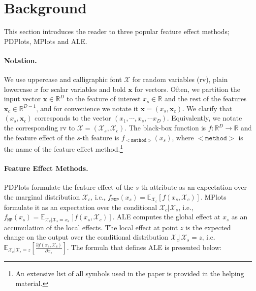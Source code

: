 \documentclass[wcp]{jmlr}
\newcommand{\xc}{\mathbf{x}_c} \newcommand{\Xcb}{\mathcal{X}_c}
\newcommand{\xb}{\mathbf{x}} \newcommand{\R}{\mathbb{R}}
\newcommand{\E}{\mathbb{E}} \newcommand{\Jac}{\mathbf{J}}
\begin{document}
\section{Background}
\label{sec:3-feature-effect}

This section introduces the reader to three popular feature effect
methods; PDPlots, MPlots and ALE.

\paragraph*{Notation.} We use uppercase and calligraphic font
\( \mathcal{X}\) for random variables (rv), plain lowercase \( x \)
for scalar variables and bold \( \xb \) for vectors. Often, we
partition the input vector \(\xb \in \R^D\) to the feature of interest
\(x_s \in \R \) and the rest of the features \(\xc \in \R^{D-1}\), and
for convenience we notate it \(\xb = (x_s, \xc)\). We clarify that
\((x_s, \xc)\) corresponds to the vector
\((x_1, \cdots, x_s, \cdots x_D)\). Equivalently, we notate the
corresponding rv to \(\mathcal{X} = (\mathcal{X}_s,
\mathcal{X}_c)\). The black-box function is
\( f: \R^D \rightarrow \R \) and the feature effect of the \(s\)-th
feature is \(f_{\mathtt{<method>}}(x_s)\), where \(\mathtt{<method>}\)
is the name of the feature effect method.\footnote{An extensive list
  of all symbols used in the paper is provided in the helping
  material.}

\paragraph{Feature Effect Methods.} PDPlots formulate the feature
effect of the \(s\)-th attribute as an expectation over the marginal
distribution \(\mathcal{X}_c\), i.e.,
\(f_{\mathtt{PDP}}(x_s) =
\mathbb{\E}_{\mathcal{X}_c}[f(x_s,\mathcal{X}_c)]\). MPlots formulate
it as an expectation over the conditional
\(\mathcal{X}_c|\mathcal{X}_s\), i.e.,
\(f_{\mathtt{MP}}(x_s) = \E_{\mathcal{X}_c|\mathcal{X}_s = x_s}[f(x_s,
\mathcal{X}_c)]\). ALE computes the global effect at \(x_s\) as an
accumulation of the local effects. The local effect at point \(z\) is
the expected change on the output over the conditional distribution
\(\Xcb|\mathcal{X}_s=z\), i.e.
\( \E_{\Xcb|\mathcal{X}_s=z} \left [ \frac{\partial f(x_s,
    \mathcal{X}_c)}{\partial x_s} \right] \). The formula that defines
ALE is presented below:
\end{document}
